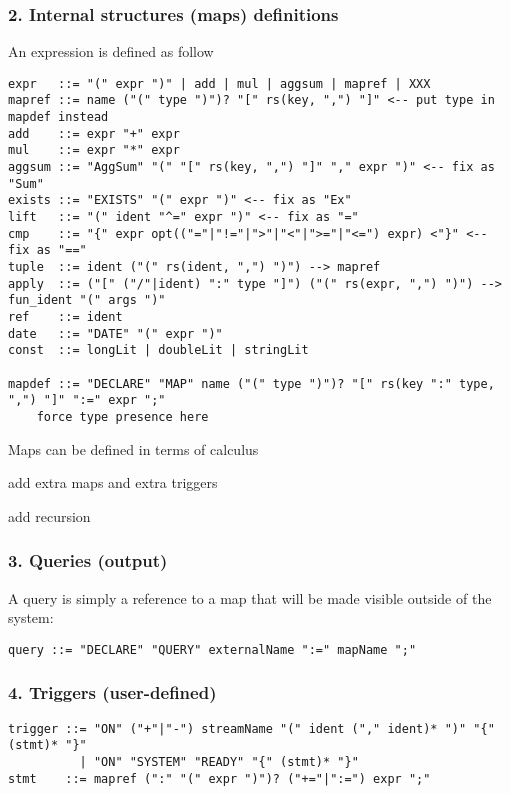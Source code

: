 \documentclass[11pt]{article}
\begin{document}
\subsubsection*{2. Internal structures (maps) definitions}
An expression is defined as follow
\begin{verbatim}
expr   ::= "(" expr ")" | add | mul | aggsum | mapref | XXX
mapref ::= name ("(" type ")")? "[" rs(key, ",") "]" <-- put type in mapdef instead
add    ::= expr "+" expr
mul    ::= expr "*" expr
aggsum ::= "AggSum" "(" "[" rs(key, ",") "]" "," expr ")" <-- fix as "Sum"
exists ::= "EXISTS" "(" expr ")" <-- fix as "Ex"
lift   ::= "(" ident "^=" expr ")" <-- fix as "="
cmp    ::= "{" expr opt(("="|"!="|">"|"<"|">="|"<=") expr) <"}" <-- fix as "=="
tuple  ::= ident ("(" rs(ident, ",") ")") --> mapref
apply  ::= ("[" ("/"|ident) ":" type "]") ("(" rs(expr, ",") ")") --> fun_ident "(" args ")"
ref    ::= ident
date   ::= "DATE" "(" expr ")"
const  ::= longLit | doubleLit | stringLit

mapdef ::= "DECLARE" "MAP" name ("(" type ")")? "[" rs(key ":" type, ",") "]" ":=" expr ";"
    force type presence here
\end{verbatim}

Maps can be defined in terms of calculus

add extra maps and extra triggers

add recursion


\subsubsection*{3. Queries (output)}
A query is simply a reference to a map that will be made visible outside of the system:
\begin{verbatim}
query ::= "DECLARE" "QUERY" externalName ":=" mapName ";"
\end{verbatim}

\subsubsection*{4. Triggers (user-defined)}
\begin{verbatim}
trigger ::= "ON" ("+"|"-") streamName "(" ident ("," ident)* ")" "{" (stmt)* "}"
          | "ON" "SYSTEM" "READY" "{" (stmt)* "}"
stmt    ::= mapref (":" "(" expr ")")? ("+="|":=") expr ";"

\end{verbatim}
\end{document}
